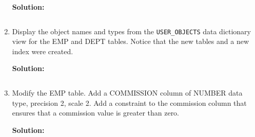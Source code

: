 \begin{enumerate}
\textbf{Solution: }
\begin{lstlisting}[language=SQL]

\end{lstlisting}


\item Display the object names and types from the \texttt{USER\_OBJECTS} data dictionary view for the EMP
and DEPT tables. Notice that the new tables and a new index were created.

\textbf{Solution: }
\begin{lstlisting}[language=SQL]

\end{lstlisting}

\item Modify the EMP table. Add a COMMISSION column of NUMBER data type, precision 2, scale 2.
Add a constraint to the commission column that ensures that a commission value is greater than
zero.

\textbf{Solution: }
\begin{lstlisting}[language=SQL]

\end{lstlisting}

\end{enumerate}

